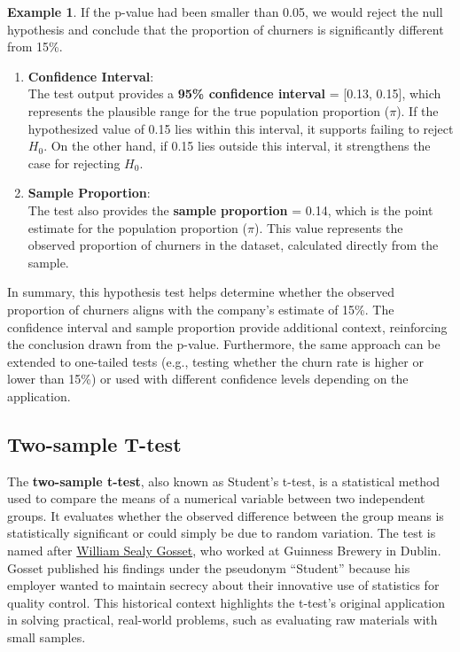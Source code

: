 \documentclass[
]{book}
\theoremstyle{definition}
\theoremstyle{definition}
\newtheorem{example}{Example}[chapter]
\theoremstyle{definition}
\theoremstyle{definition}
\theoremstyle{remark}
\begin{document}
\begin{example}
If the p-value had been smaller than 0.05, we would reject the null hypothesis and conclude that the proportion of churners is significantly different from 15\%.

\begin{enumerate}
\def\labelenumi{\arabic{enumi}.}
\setcounter{enumi}{1}
\item
  \textbf{Confidence Interval}:\\
  The test output provides a \textbf{95\% confidence interval} = {[}0.13, 0.15{]}, which represents the plausible range for the true population proportion (\(\pi\)). If the hypothesized value of 0.15 lies within this interval, it supports failing to reject \(H_0\). On the other hand, if 0.15 lies outside this interval, it strengthens the case for rejecting \(H_0\).
\item
  \textbf{Sample Proportion}:\\
  The test also provides the \textbf{sample proportion} = 0.14, which is the point estimate for the population proportion (\(\pi\)). This value represents the observed proportion of churners in the dataset, calculated directly from the sample.
\end{enumerate}

In summary, this hypothesis test helps determine whether the observed proportion of churners aligns with the company's estimate of 15\%. The confidence interval and sample proportion provide additional context, reinforcing the conclusion drawn from the p-value. Furthermore, the same approach can be extended to one-tailed tests (e.g., testing whether the churn rate is higher or lower than 15\%) or used with different confidence levels depending on the application.
\end{example}

\subsection{Two-sample T-test}\label{two-sample-t-test}

The \textbf{two-sample t-test}, also known as Student's t-test, is a statistical method used to compare the means of a numerical variable between two independent groups. It evaluates whether the observed difference between the group means is statistically significant or could simply be due to random variation. The test is named after \href{https://en.wikipedia.org/wiki/William_Sealy_Gosset}{William Sealy Gosset}, who worked at Guinness Brewery in Dublin. Gosset published his findings under the pseudonym ``Student'' because his employer wanted to maintain secrecy about their innovative use of statistics for quality control. This historical context highlights the t-test's original application in solving practical, real-world problems, such as evaluating raw materials with small samples.
\end{document}
